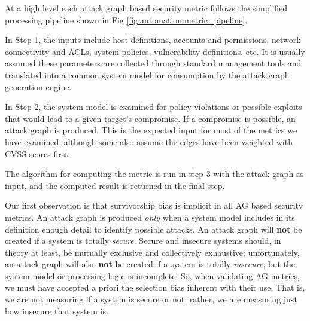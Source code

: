 



At a high level each attack graph based security metric follows the simplified processing pipeline shown in Fig \ref{fig:automation:metric_pipeline}. 



In Step 1, the inputs include host definitions, accounts and permissions, network connectivity and ACLs, system policies, vulnerability definitions, etc. It is usually assumed these parameters are collected through standard management tools and translated into a common system model for consumption by the attack graph generation engine. 

In Step 2, the system model is examined for policy violations or possible exploits that would lead to a given target's compromise. If a compromise is possible, an attack graph is produced. This is the expected input for most of the metrics we have examined, although some also assume the edges have been weighted with CVSS scores first.

The algorithm for computing the metric is run in step 3 with the attack graph as input, and the computed result is returned in the final step. 

Our first observation is that survivorship bias\cite{Wald_1980} is implicit in all AG based security metrics. An attack graph is produced \textit{only} when a system model includes in its definition enough detail to identify possible attacks. An attack graph will \textbf{not} be created if a system is totally \textit{secure}. Secure and insecure systems should, in theory at least, be mutually exclusive and collectively exhaustive; unfortunately, an attack graph will also \textbf{not} be created if a system is totally \textit{insecure}, but the system model or processing logic is incomplete. So, when validating AG metrics, we must have accepted a priori the selection bias inherent with their use. That is, we are not measuring if a system is secure or not; rather, we are measuring just how insecure that system is. 

